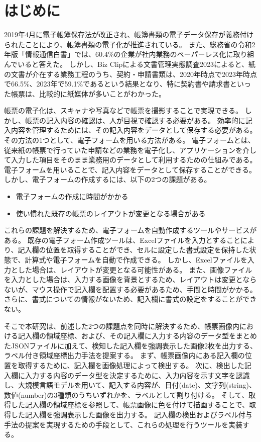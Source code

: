 \chapter{はじめに}\label{cha:Introduction}
2019年4月に電子帳簿保存法が改正され、帳簿書類の電子データ保存が義務付けられたことにより、帳簿書類の電子化が推進されている\cite{電子帳簿保存法}。
また、総務省の令和2年版「情報通信白書」では、60.4\%の企業が社内業務のペーパーレス化に取り組んでいると答えた\cite{デジタルデータの経済的価値の計測と活用の現状に関する調査研究}。
しかし、Biz Clipによる文書管理実態調査2023によると、紙の文書が介在する業務工程のうち、契約・申請書類は、2020年時点で2023年時点で66.5\%、2023年で59.1\%であるという結果となり、特に契約書や請求書といった帳票は、比較的に紙媒体が多いことがわかった\cite{文書管理実態調査2023}。

帳票の電子化は、スキャナや写真などで帳票を撮影することで実現できる。
しかし、帳票の記入内容の確認は、人が目視で確認する必要がある。
効率的に記入内容を管理するためには、その記入内容をデータとして保存する必要がある。
その方法の1つとして、電子フォームを用いる方法がある。
電子フォームとは、従来紙の帳票で行っていた申請などの業務を電子化し、アプリケーションを介して入力した項目をそのまま業務用のデータとして利用するための仕組みである\cite{電子フォーム}。
電子フォームを用いることで、記入内容をデータとして保存することができる。
しかし、電子フォームの作成するには、以下の2つの課題がある。

\begin{itemize}
  \item 電子フォームの作成に時間がかかる
  \item 使い慣れた既存の帳票のレイアウトが変更となる場合がある
\end{itemize}

これらの課題を解決するため、電子フォームを自動作成するツールやサービスがある。
既存の電子フォーム作成ツール\cite{i-Reporter}\cite{Create!Form}は、Excelファイルを入力とすることにより、記入欄の位置を取得することができ、セルに設定した書式設定を保持した状態で、計算式や電子フォームを自動で作成できる。
しかし、Excelファイルを入力とした場合は、レイアウトが変更となる可能性がある。
また、画像ファイルを入力とした場合は、入力する画像を背景とするため、レイアウトは変更とならないが、マウス操作で記入欄を配置する必要があるため、手間と時間がかかる。
さらに、書式についての情報がないため、記入欄に書式の設定をすることができない。

そこで本研究は、前述した2つの課題点を同時に解決するため、帳票画像内における記入欄の領域座標、および、その記入欄に入力する内容のデータ型をまとめたJSONファイルに加えて、検知した記入欄を強調表示した画像2枚を出力する、ラベル付き領域座標出力手法を提案する。
まず、帳票画像内にある記入欄の位置を取得するために、記入欄を画像処理によって検出する。
次に、検出した記入欄に入力する内容のデータ型を決定するために、入力内容を示す文字を認識し、大規模言語モデルを用いて、記入する内容が、日付(date)、文字列(string)、数値(number)の3種類のうちいずれかを、ラベルとして割り付ける。
そして、取得した記入欄の領域座標を参照して、帳票画像に色を付けて描画することで、取得した記入欄を強調表示した画像を出力する。
記入欄の検出およびラベル付与手法の提案を実現するための手段として、これらの処理を行うツールを実装する。

